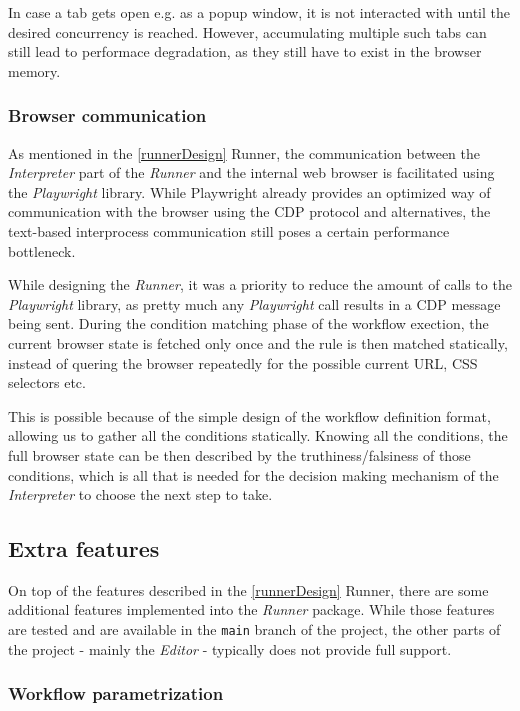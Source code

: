 In case a tab gets open e.g. as a popup window, it is not interacted with until the desired concurrency is reached.
However, accumulating multiple such tabs can still lead to performace degradation, as they still have to exist in the browser memory.

\subsubsection{Browser communication} \label{browsercom}
As mentioned in the \autoref{runnerDesign} Runner, the communication between the \textit{Interpreter} part of the \textit{Runner} and the internal web browser is facilitated using the \textit{Playwright} library.
While Playwright already provides an optimized way of communication with the browser using the \acs{CDP} protocol and alternatives, the text-based interprocess communication still poses a certain performance bottleneck.

While designing the \textit{Runner}, it was a priority to reduce the amount of calls to the \textit{Playwright} library, as pretty much any \textit{Playwright} call results in a \acs{CDP} message being sent.
During the condition matching phase of the workflow exection, the current browser state is fetched only once and the rule is then matched statically, instead of quering the browser repeatedly for the possible current URL, CSS selectors etc.

This is possible because of the simple design of the workflow definition format, allowing us to gather all the conditions statically. 
Knowing all the conditions, the full browser state can be then described by the truthiness/falsiness of those conditions, which is all that is needed for the decision making mechanism of the \textit{Interpreter} to choose the next step to take.

\subsection{Extra features}

On top of the features described in the \autoref{runnerDesign} Runner, there are some additional features implemented into the \textit{Runner} package.
While those features are tested and are available in the \verb|main| branch of the project, the other parts of the project - mainly the \textit{Editor} - typically does not provide full support.

\subsubsection{Workflow parametrization}

